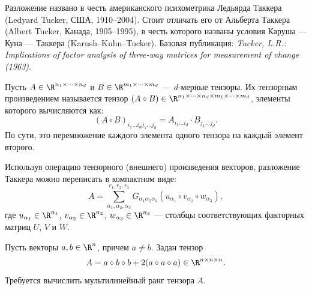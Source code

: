 \begin{tcbremark}
    Разложение названо в честь американского психометрика Ледьярда Таккера (Ledyard Tucker, США, 1910–2004). Стоит отличать его от Альберта Таккера (Albert Tucker, Канада, 1905–1995), в честь которого названы условия Каруша — Куна — Таккера (Karush–Kuhn–Tucker). Базовая публикация: \textit{Tucker, L.R.: Implications of factor analysis of three-way matrices for measurement of change (1963)}.
\end{tcbremark}

\begin{tcbdefinition}
\label{def:tensor-product}
    Пусть $A \in \R^{n_1 \times \dots \times n_d}$ и $B \in \R^{m_1 \times \dots \times m_d}$ — $d$-мерные тензоры. Их тензорным произведением называется тензор $(A \circ B) \in \R^{n_1 \times \dots \times n_d \times m_1 \times \dots \times m_d}$, элементы которого вычисляются как:
    \[
        (A \circ B)_{i_1 \dots i_d j_1 \dots j_d} = A_{i_1 \dots i_d} \cdot B_{j_1 \dots j_d}.
    \]
    По сути, это перемножение каждого элемента одного тензора на каждый элемент второго.
\end{tcbdefinition}

\begin{tcbinsight}
    Используя операцию тензорного (внешнего) произведения векторов, разложение Таккера можно переписать в компактном виде:
    \[
        A = \sum_{\alpha_1, \alpha_2, \alpha_3}^{r_1, r_2, r_3} G_{\alpha_1 \alpha_2 \alpha_3} \left( u_{\alpha_1} \circ v_{\alpha_2} \circ w_{\alpha_3} \right),
    \]
    где $u_{\alpha_1} \in \R^{n_1}$, $v_{\alpha_2} \in \R^{n_2}$, $w_{\alpha_3} \in \R^{n_3}$ — столбцы соответствующих факторных матриц $U$, $V$ и $W$.
\end{tcbinsight}

\begin{tcbexample}
\label{ex:task1}
    Пусть векторы $a, b \in \R^n$, причем $a \neq b$. Задан тензор
    \[
        A = a \circ b \circ b + 2 (a \circ a \circ a) \in \R^{n \times n \times n}.
    \]
    Требуется вычислить мультилинейный ранг тензора $A$.
\end{tcbexample}

